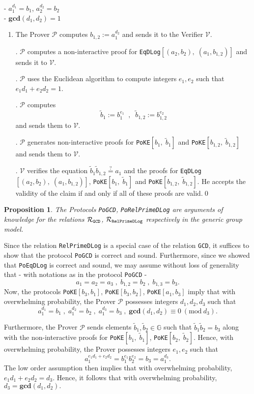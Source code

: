 \documentclass[11pt, lettersize, notitlepage, leqno, footskip=0.6cm]{article}
\newcommand{\wti}{\widetilde}
\newcommand{\mc}{\mathcal}
\newcommand{\mb}{\mathbb}
\newcommand{\mbf}{\mathbf}
\newcommand{\mP}{\mc{P}}
\newcommand{\V}{\mc{V}}
\newcommand{\vs}{\vspace{-0.15cm}}
\newcommand{\noin}{\noindent}
\newcommand{\op}{overwhelming probability}
\newcommand{\Mod}[1]{\ (\mathrm{mod}\ #1)}
\newcommand{\GCD}{\mbf{gcd}}
\newtheorem{Prop}[Thm]{Proposition}
\numberwithin{equation}{section}
\begin{document}
\noindent - $a_1^{d_1} = b_1$, $a_2^{d_2} = b_2$\\
\noindent - $\GCD(d_1, d_2) = 1$
 

\begin{enumerate}[wide, labelwidth=!, labelindent=0pt]\vs \item The Prover $\mc{P}$ computes $b_{1,2}:= a_1^{d_2}$ and sends it to the Verifier $\V$. 

. $\mP$ computes a non-interactive proof for \verb|EqDLog|$[(a_2, b_2),\; (a_1, b_{1,2})]$ and sends it to $\mc{V}$.

. $\mc{P}$ uses the Euclidean algorithm to compute integers $e_1, e_2$ such that $e_1d_1 + e_2d_2 = 1$.

\noin 4. $\mc{P}$ computes \vs $$\wti{b}_1:= b_1^{e_1}\;\;,\;\; \wti{b}_{1,2}:= b_{1,2}^{e_2} $$ and sends them to $\V$. 

\noin 5. $\mP$ generates non-interactive proofs for \verb|PoKE|$[b_1,\; \wti{b}_1]$ and \verb|PoKE|$[b_{1,2},\; \wti{b}_{1,2}]$ and sends them to $\mc{V}$.

. $\mc{V}$ verifies the equation $\wti{b}_1\wti{b}_{1,2}\stackrel{?}{=} a_1$ and the proofs for \verb|EqDLog|$[(a_2, b_2),\; (a_1, b_{1,2})]$, \verb|PoKE|$[b_1,\; \wti{b}_1]$ and \verb|PoKE|$[b_{1,2},\; \wti{b}_{1,2}]$. He accepts the validity of the claim if and only if all of these proofs are valid.\qed \end{enumerate}

\vspace{0.1cm}

\begin{Prop} The Protocols \verb|PoGCD|, \verb|PoRelPrimeDLog| are arguments of knowledge for the relations $\mc{R}_{{\tt{GCD}}}$, $\mc{R}_{{\tt{RelPrimeDLog}}}$ respectively in the generic group model.\end{Prop}

\begin{prf} Since the relation \verb|RelPrimeDLog| is a special case of the relation \verb|GCD|, it suffices to show that the protocol \verb|PoGCD| is correct and sound. Furthermore, since we showed that \verb|PoEqDLog| is correct and sound, we may assume without loss of generality that - with notations as in the protocol \verb|PoGCD| - \vs $$a_1 = a_2 = a_3\;,\; {b}_{1,2} = b_2\;,\;{b}_{1,3} = b_3 .$$ Now, the protocols \verb|PoKE|$[b_3, b_1]$, \verb|PoKE|$[b_3, b_2]$, \verb|PoKE|$[a_1, b_3]$ imply that with \op, the Prover $\mP$ possesses integers $d_1,d_2,d_3$ such that \vs $$a_1^{d_1} = b_1\;,\;a_1^{d_2} = b_2\;,\;a_1^{d_3} = b_3\;,\;\GCD(d_1,d_2)\equiv 0\Mod{d_3}.$$ 

Furthermore, the Prover $\mP$ sends elements $\wti{b}_1, \wti{b}_2\in \mb{G}$ such that $\wti{b}_1\wti{b}_2 = b_3$ along with the non-interactive proofs for \verb|PoKE|$[b_1,\;\wti{b}_1]$, \verb|PoKE|$[b_2,\;\wti{b}_2]$. Hence, with \op, the Prover possesses integers $e_1,e_2$ such that \vs $$a_1^{e_1d_1+e_2d_2} = b_1^{e_1}b_2^{e_2} = b_3 = a_1^{d_3}.$$ The low order assumption then implies that with \op, $e_1d_1+e_2d_2 = d_3$. Hence, it follows that with \op, $d_3 = \GCD(d_1,d_2).$ 
\end{prf}
\end{document}
